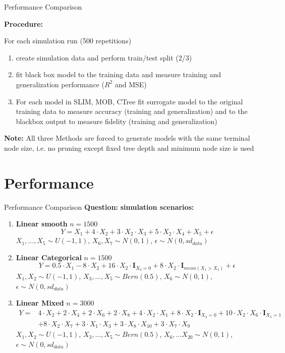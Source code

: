 \documentclass[9pt, xcolor=table]{beamer}
\begin{document}
\begin{frame}{Performance Comparison}


\textbf{Procedure:} 

For each simulation run (500 repetitions)
\begin{enumerate}
    \item create simulation data and perform train/test split (2/3)
    \item fit black box model to the training data and measure training and generalization performance ($R^2$ and MSE)
    \item For each model in SLIM, MOB, CTree fit surrogate model to the original training data to measure accuracy (training and generalization) and to the blackbox output to measure fidelity (training and generalization)
\end{enumerate}

\textbf{Note:} All three Methods are forced to generate models with the same terminal node size, i.e. no pruning except fixed tree depth and minimum node size is used

\end{frame}

\section{Performance}
\begin{frame}{Performance Comparison}
\textbf{Question:} 
\textbf{simulation scenarios:}
\begin{enumerate}
    \item \textbf{Linear smooth} $n= 1500$ $$ Y = X_1 + 4 \cdot X_2 + 3 \cdot X_2 \cdot X_3 + 5\cdot X_2\cdot X_4 + X_5 + \epsilon $$
    $X_1,..., X_5 \sim U(-1,1)$, $X_6, X_7 \sim N(0,1)$, $\epsilon \sim N(0, sd_{data})$
    
    \item \textbf{Linear Categorical} $n= 1500$ $$ Y =  0.5\cdot X_{1} - 8\cdot X_2 + 16\cdot X_2\cdot \mathbf{I}_{X_3 = 0} + 8\cdot X_2\cdot \mathbf{I}_{mean(X_1 > X_1)} + \epsilon $$
    $X_1, X_2 \sim U(-1,1)$, $X_3, ..., X_5 \sim Bern(0.5)$, $X_6 \sim N(0,1)$,  $\epsilon \sim N(0, sd_{data})$
    
    \item \textbf{Linear Mixed}  $n= 3000$
    \begin{align*}
    Y = & 4 \cdot X_2 + 2 \cdot X_4 + 2 \cdot X_6 + 2 \cdot X_8 + 4 \cdot X_2 \cdot X_1 + 8 \cdot X_2 \cdot \mathbf{I}_{X_3 = 0} + 10 \cdot X_2 \cdot X_6  \cdot \mathbf{I}_{X_5 = 1} \\
    & + 8 \cdot X_2 \cdot X_7 + 3 \cdot X_1 \cdot X_3 + 3 \cdot X_8 \cdot X_10 + 3 \cdot X_7 \cdot X_9     
    \end{align*}
    $X_1, X_2 \sim U(-1,1)$, $X_3, ..., X_5 \sim Bern(0.5)$, $X_6, ... X_20 \sim N(0,1)$,  $\epsilon \sim N(0, sd_{data})$
\end{enumerate}
    
\end{frame}
\end{document}
